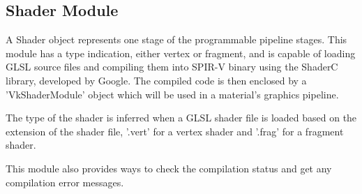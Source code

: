 \subsection{Shader Module}
A Shader object represents one stage of the programmable pipeline stages. This module has a type indication, either vertex or fragment, and is capable of loading GLSL source files and compiling them into SPIR-V binary using the ShaderC library, developed by Google. The compiled code is then enclosed by a 'VkShaderModule' object which will be used in a material's graphics pipeline.

The type of the shader is inferred when a GLSL shader file is loaded based on the extension of the shader file, '.vert' for a vertex shader and '.frag' for a fragment shader.

This module also provides ways to check the compilation status and get any compilation error messages.

